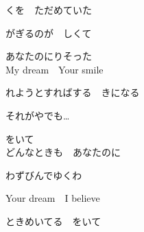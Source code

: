 {くを　ただめていた

がぎるのが　しくて

あなたのにりそった
\\

My dream　Your smile

れようとすればする　きになる

それがやでも…

をいて
\\

どんなときも　あなたのに

わずびんでゆくわ

Your dream　I believe

ときめいてる　をいて

}